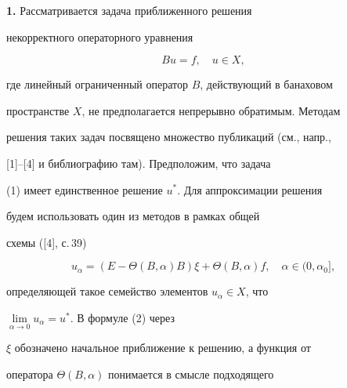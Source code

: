 \date{}




\pagestyle{plain} %







\maketitle


\label{begin}








{\bf 1.} Рассматривается задача приближенного решения


некорректного операторного уравнения


\begin{equation}


B u = f,\quad u\in X,


\end{equation}


где линейный ограниченный оператор $B$, действующий в банаховом


пространстве $X$, не предполагается непрерывно обратимым. Методам


решения таких задач посвящено множество публикаций (см., напр.,


[1]--[4] и библиографию там). Предположим, что задача


(1) имеет единственное решение $u^*$. Для аппроксимации решения


будем использовать один из методов в рамках общей


схемы ([4], с.\,39)


\begin{equation}


u_\alpha=(E - \Theta(B,\alpha)B)\xi + \Theta(B,\alpha)f,


\quad\alpha\in(0,\alpha_0],


\end{equation}


определяющей такое семейство элементов $u_\alpha\in X$, что


$\lim\limits_{\alpha\to 0} u_\alpha = u^*$. В формуле (2) через


$\xi$ обозначено начальное приближение к решению, а функция от


оператора $\Theta(B,\alpha)$ понимается в смысле подходящего


